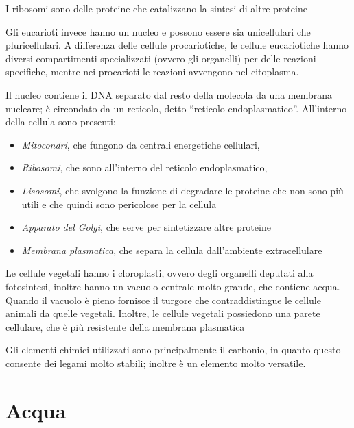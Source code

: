 I ribosomi sono delle proteine che catalizzano la sintesi di altre
proteine

Gli eucarioti invece hanno un nucleo e possono essere sia unicellulari
che pluricellulari. A differenza delle cellule procariotiche, le cellule
eucariotiche hanno diversi compartimenti specializzati (ovvero gli
organelli) per delle reazioni specifiche, mentre nei procarioti le
reazioni avvengono nel citoplasma.

Il nucleo contiene il DNA separato dal resto della molecola da una
membrana nucleare; è circondato da un reticolo, detto ``reticolo
endoplasmatico''. All'interno della cellula sono presenti:
\begin{itemize}
    \item \emph{Mitocondri},
    che fungono da centrali energetiche cellulari,
    \item \emph{Ribosomi}, che sono
    all'interno del reticolo endoplasmatico, 
    \item \emph{Lisosomi}, che svolgono la
    funzione di degradare le proteine che non sono più utili e che quindi
    sono pericolose per la cellula 
    \item \emph{Apparato del Golgi}, che serve per
    sintetizzare altre proteine
    \item \emph{Membrana plasmatica}, che separa la cellula
    dall'ambiente extracellulare
\end{itemize}

Le cellule vegetali hanno i cloroplasti, ovvero degli organelli deputati
alla fotosintesi, inoltre hanno un vacuolo centrale molto grande, che
contiene acqua. Quando il vacuolo è pieno fornisce il turgore che
contraddistingue le cellule animali da quelle vegetali. Inoltre, le
cellule vegetali possiedono una parete cellulare, che è più resistente
della membrana plasmatica



Gli elementi chimici utilizzati sono principalmente il carbonio, in
quanto questo consente dei legami molto stabili; inoltre è un elemento
molto versatile.


\section{Acqua}

